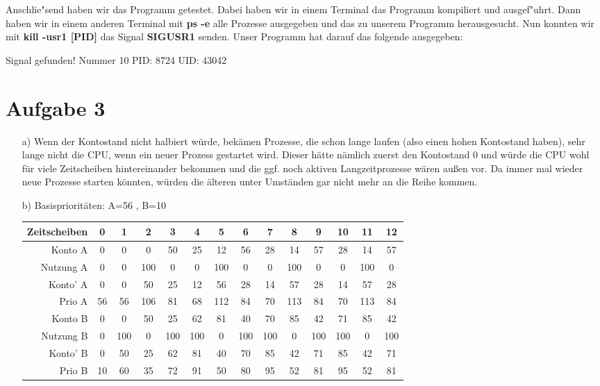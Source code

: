 \documentclass{ti2}
\begin{document}
Anschlie"send haben wir das Programm getestet. Dabei haben wir in einem Terminal das Programm kompiliert und ausgef"uhrt. Dann haben wir in einem anderen Terminal mit \textbf{ps -e} alle Prozesse ausgegeben und das zu unserem Programm herausgesucht. Nun konnten wir mit \textbf{kill -usr1 [PID]} das Signal \textbf{SIGUSR1} senden. Unser Programm hat darauf das folgende ausgegeben:
\begin{listing}{0}
Signal gefunden!
Nummer 10  PID: 8724  UID: 43042
\end{listing}
\section*{Aufgabe 3}
\begin{itemize}
\item[a)]
Wenn der Kontostand nicht halbiert würde, bekämen Prozesse, die schon lange laufen (also einen hohen Kontostand haben), sehr lange nicht die CPU, wenn ein neuer Prozess gestartet wird. Dieser hätte nämlich zuerst den Kontostand 0 und würde die CPU wohl für viele Zeitscheiben hintereinander bekommen und die ggf. noch aktiven Langzeitprozesse wären außen vor. Da immer  mal wieder neue Prozesse starten könnten, würden die älteren unter Umständen gar nicht mehr an die Reihe kommen.
\item[b)]
Basisprioritäten: A=56 , B=10
\begin{table}[h]
\begin{tabular}{r|ccccccccccccc}
Zeitscheiben & 0 & 1 & 2 & 3 & 4 & 5 & 6 & 7 & 8 & 9 & 10 & 11 & 12\\
\hline
Konto A      & 0 & 0 & 0  & 50 & 25  & 12  & 56  & 28  & 14  & 57  & 28   & 14   & 57   \\
Nutzung A    & 0 & 0 & 100 & 0 &  0 &  100 & 0  &  0 &  100 & 0  &  0  & 100   & 0   \\
Konto' A     & 0 & 0 & 50 & 25 & 12  & 56  &  28 & 14  &  57 & 28  &  14  & 57   & 28   \\
Prio A       & 56 & 56  &106 & 81 & 68  &112   & 84  & 70  &113   & 84  &  70  & 113   & 84   \\
\hline
Konto B 	 & 0 & 0 & 50 & 25 &  62 & 81  &  40 & 70  &  85 &  42 & 71  & 85   & 42   \\
Nutzung B    & 0 & 100 &0  & 100 &  100 & 0  & 100  & 100  & 0  & 100  &  100  & 0   &  100  \\
Konto' B     & 0 &  50 &25  &62 & 81  & 40  & 70  & 85  &  42 &  71 &  85  &  42  & 71   \\
Prio B       & 10 &  60 & 35 &72  & 91  & 50  & 80  & 95  & 52  & 81  &  95  & 52   & 81   


\end{tabular}
\end{table}
\end{itemize}
\end{document}
